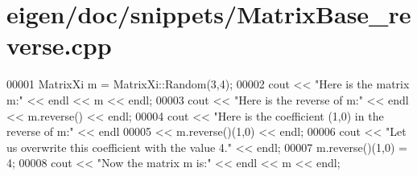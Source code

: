 \hypertarget{eigen_2doc_2snippets_2_matrix_base__reverse_8cpp_source}{}\section{eigen/doc/snippets/\+Matrix\+Base\+\_\+reverse.cpp}
\label{eigen_2doc_2snippets_2_matrix_base__reverse_8cpp_source}

\begin{DoxyCode}
00001 MatrixXi m = MatrixXi::Random(3,4);
00002 cout << \textcolor{stringliteral}{"Here is the matrix m:"} << endl << m << endl;
00003 cout << \textcolor{stringliteral}{"Here is the reverse of m:"} << endl << m.reverse() << endl;
00004 cout << \textcolor{stringliteral}{"Here is the coefficient (1,0) in the reverse of m:"} << endl
00005      << m.reverse()(1,0) << endl;
00006 cout << \textcolor{stringliteral}{"Let us overwrite this coefficient with the value 4."} << endl;
00007 m.reverse()(1,0) = 4;
00008 cout << \textcolor{stringliteral}{"Now the matrix m is:"} << endl << m << endl;
\end{DoxyCode}
